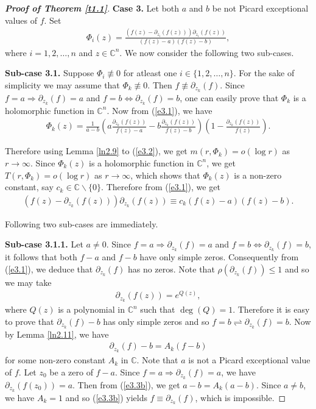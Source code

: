 \documentclass[11pt, reqno]{amsart}
\newtheorem*{cor A}{Corollary A}
\newtheorem*{cor B}{Corollary B}
\newcommand{\bea}{\begin{eqnarray}}
\newcommand{\eea}{\end{eqnarray}}
\numberwithin{equation}{section}
\begin{document}
\begin{proof}[{\bf Proof of Theorem \ref{t1.1}}]
\smallskip
{\bf Case 3.} Let both $a$ and $b$ be not Picard exceptional values of $f$. 
Set
\bea\label{e3.1} \Phi_i(z)=\frac{(f(z)-\partial_{z_i}(f(z)))\partial_{z_i}(f(z))}{(f(z)-a)(f(z)-b)},\eea
where $i=1,2,\ldots,n$ and $z\in\mathbb{C}^n$.
We now consider the following two sub-cases.\par

\smallskip
{\bf Sub-case 3.1.} Suppose $\Phi_i\not\equiv 0$ for atleast one $i\in\{1,2,\ldots,n\}$. For the sake of simplicity we may assume that $\Phi_k\not\equiv 0$. Then $f\not\equiv \partial_{z_k}(f)$. Since $f=a\Rightarrow \partial_{z_k}(f)=a$ and $f=b\Leftrightarrow \partial_{z_k}(f)=b$, one can easily prove that $\Phi_k$ is a holomorphic function in $\mathbb{C}^n$. 
Now from (\ref{e3.1}), we have 
\begin{align}\label{e3.2} 
\Phi_k(z)=\frac{1}{a-b}\left(a\frac{\partial_{z_k}(f(z))}{f(z)-a}-b\frac{\partial_{z_k}(f(z))}{f(z)-b}\right)\left(1-\frac{\partial_{z_k}(f(z))}{f(z)}\right).
\end{align}

Therefore using Lemma \ref{ln2.9} to (\ref{e3.2}), we get $m(r,\Phi_k)=o(\log r)$ as $r\to\infty$. Since $\Phi_k(z)$ is a holomorphic function in $\mathbb{C}^n$, we get $T(r,\Phi_k)=o(\log r)$ as $r\to\infty$, which shows that $\Phi_k(z)$ is a non-zero constant, say $c_k\in\mathbb{C}\backslash \{0\}$. Therefore from (\ref{e3.1}), we get
\begin{align}\label{e3.2a} 
(f(z)-\partial_{z_k}(f(z)))\partial_{z_k}(f(z))\equiv c_k(f(z)-a)(f(z)-b).
\end{align}

Following two sub-cases are immediately.\par

\smallskip
{\bf Sub-case 3.1.1.} Let $a\neq 0$. Since $f=a\Rightarrow \partial_{z_k}(f)=a$ and $f=b\Leftrightarrow \partial_{z_k}(f)=b$, it follows that both $f-a$ and $f-b$ have only simple zeros. Consequently from (\ref{e3.1}), we deduce that $\partial_{z_k}(f)$ has no zeros. Note that $\rho(\partial_{z_k}(f))\leq 1$ and so we may take 
\begin{align}\label{e3.3a}
\partial_{z_k}(f(z))=e^{Q(z)},
\end{align} where $Q(z)$ is a polynomial in $\mathbb{C}^n$ such that $\deg(Q)=1$. Therefore it is easy to prove that $\partial_{z_k}(f)-b$ has only simple zeros and so $f=b\rightleftharpoons \partial_{z_k}(f)=b$. Now by Lemma \ref{ln2.11}, we have
\begin{align}\label{e3.3b}
\partial_{z_k}(f)-b=A_k(f-b)
\end{align}
for some non-zero constant $A_k$ in $\mathbb{C}$. Note that $a$ is not a Picard exceptional value of $f$. Let $z_0$ be a zero of $f-a$. Since $f=a\Rightarrow \partial_{z_k}(f)=a$, we have $\partial_{z_k}(f(z_0))=a$. Then from (\ref{e3.3b}), we get $a-b=A_k(a-b)$. Since $a\neq b$, we have $A_k=1$ and so (\ref{e3.3b}) yields $f\equiv \partial_{z_k}(f)$, which is impossible. 


\end{proof}
\end{document}
